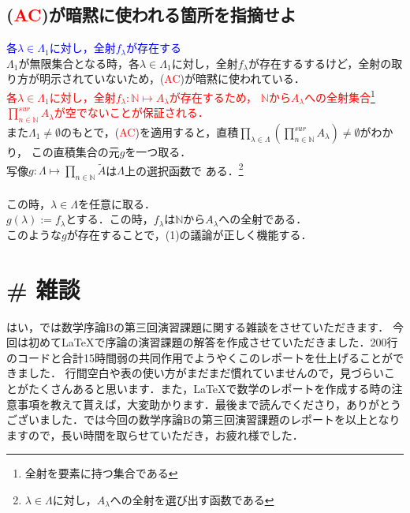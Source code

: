 \documentclass{jarticle}
\begin{document}
\subsection{(\textcolor{red}{AC})が暗黙に使われる箇所を指摘せよ}
\textcolor{blue}{各$\lambda \in \Lambda_1$に対し，全射$f_\lambda$が存在する}\\
$\Lambda_1$が無限集合となる時，各$\lambda \in \Lambda_1$に対し，全射$f_\lambda$が存在するするけど，全射の取り方が明示されていないため，(\textcolor{red}{AC})が暗黙に使われている．\\
\textcolor{red}{各$\lambda \in \Lambda_1$に対し，全射$f_\lambda : \mathbb{N} \mapsto A_\lambda$が存在するため，
	$\mathbb{N}$から$A_\lambda$への全射集合\footnote{全射を要素に持つ集合である} $\prod\limits_{n \in \mathbb{N}}^{sur} A_\lambda$が空でないことが保証される．}\\
        また$\Lambda_1 \neq \emptyset$のもとで，(\textcolor{red}{AC})を適用すると，直積$\prod\limits_{\lambda \in \Lambda}(\prod\limits_{n \in \mathbb{N}}^{sur} A_\lambda) \neq \emptyset$がわかり，
        この直積集合の元$g$を一つ取る．\\
        写像$g : \Lambda \mapsto \prod\limits_{n \in \mathbb{N} } \tilde{A}$は$\Lambda$上の選択函数で
ある．\footnote{$\lambda \in \Lambda$に対し，$A_\lambda$への全射を選び出す函数である}\\
        \\
        この時，$\lambda \in \Lambda$を任意に取る．\\
        $g(\lambda):=f_\lambda$とする．この時，$f_\lambda $は$\mathbb{N}$から$A_\lambda$への全射である．\\
このような$g$が存在することで，(1)の議論が正しく機能する．
\section*{\# 雑談}
はい，では数学序論Bの第三回演習課題に関する雑談をさせていただきます．
今回は初めて\LaTeX で序論の演習課題の解答を作成させていただきました．200行のコードと合計15時間弱の共同作用でようやくこのレポートを仕上げることができました．
行間空白や表の使い方がまだまだ慣れていませんので，見づらいことがたくさんあると思います．また，\LaTeX で数学のレポートを作成する時の注意事項を教えて貰えば，大変助かります．最後まで読んでくださり，ありがとうございました．では今回の数学序論Bの第三回演習課題のレポートを以上となりますので，長い時間を取らせていただき，お疲れ様でした．
\end{document}
